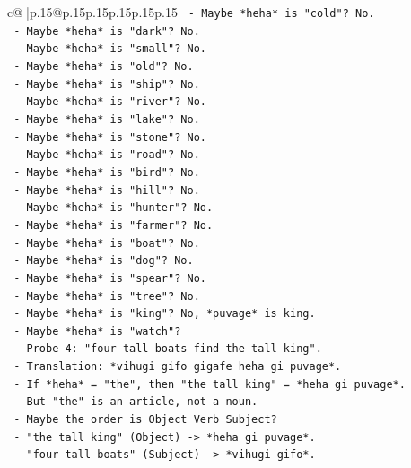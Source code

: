 \documentclass{article}
\begin{document}
{\begin{supertabular}{c@{$\;$}|p{.15\linewidth}@{}p{.15\linewidth}p{.15\linewidth}p{.15\linewidth}p{.15\linewidth}p{.15\linewidth}}
{{{\texttt{          {-} Maybe *heha* is "cold"? No.} \\
\texttt{          {-} Maybe *heha* is "dark"? No.} \\
\texttt{          {-} Maybe *heha* is "small"? No.} \\
\texttt{          {-} Maybe *heha* is "old"? No.} \\
\texttt{          {-} Maybe *heha* is "ship"? No.} \\
\texttt{          {-} Maybe *heha* is "river"? No.} \\
\texttt{          {-} Maybe *heha* is "lake"? No.} \\
\texttt{          {-} Maybe *heha* is "stone"? No.} \\
\texttt{          {-} Maybe *heha* is "road"? No.} \\
\texttt{          {-} Maybe *heha* is "bird"? No.} \\
\texttt{          {-} Maybe *heha* is "hill"? No.} \\
\texttt{          {-} Maybe *heha* is "hunter"? No.} \\
\texttt{          {-} Maybe *heha* is "farmer"? No.} \\
\texttt{          {-} Maybe *heha* is "boat"? No.} \\
\texttt{          {-} Maybe *heha* is "dog"? No.} \\
\texttt{          {-} Maybe *heha* is "spear"? No.} \\
\texttt{          {-} Maybe *heha* is "tree"? No.} \\
\texttt{          {-} Maybe *heha* is "king"? No, *puvage* is king.} \\
\texttt{          {-} Maybe *heha* is "watch"?} \\
\texttt{            {-} Probe 4: "four tall boats find the tall king".} \\
\texttt{            {-} Translation: *vihugi gifo gigafe heha gi puvage*.} \\
\texttt{            {-} If *heha* = "the", then "the tall king" = *heha gi puvage*.} \\
\texttt{            {-} But "the" is an article, not a noun.} \\
\texttt{            {-} Maybe the order is Object Verb Subject?} \\
\texttt{            {-} "the tall king" (Object) {-}> *heha gi puvage*.} \\
\texttt{            {-} "four tall boats" (Subject) {-}> *vihugi gifo*.} \\
}}}
\end{supertabular}}
\end{document}
